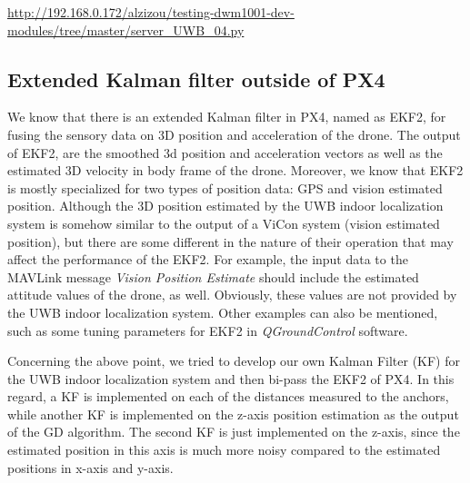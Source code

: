\documentclass{article}
\begin{document}
\url{http://192.168.0.172/alzizou/testing-dwm1001-dev-modules/tree/master/server_UWB_04.py}


\subsection{Extended Kalman filter outside of PX4}
We know that there is an extended Kalman filter in PX4, named as EKF2, for fusing the sensory data on 3D position and acceleration of the drone. 
The output of EKF2, are the smoothed 3d position and acceleration vectors as well as the estimated 3D velocity in body frame of the drone. 
Moreover, we know that EKF2 is mostly specialized for two types of position data: GPS and vision estimated position. 
Although the 3D position estimated by the UWB indoor localization system is somehow similar to the output of a ViCon system (vision estimated position), but there are some different in the nature of their operation that may affect the performance of the EKF2.
For example, the input data to the MAVLink message \textit{Vision Position Estimate} should include the estimated attitude values of the drone, as well. Obviously, these values are not provided by the UWB indoor localization system. Other examples can also be mentioned, such as some tuning parameters for EKF2 in \textit{QGroundControl} software.

Concerning the above point, we tried to develop our own Kalman Filter (KF) for the UWB indoor localization system and then bi-pass the EKF2 of PX4.
In this regard, a KF is implemented on each of the distances measured to the anchors, while another KF is implemented on the z-axis position estimation as the output of the GD algorithm. The second KF is just implemented on the z-axis, since the estimated position in this axis is much more noisy compared to the estimated positions in x-axis and y-axis. 
\end{document}
